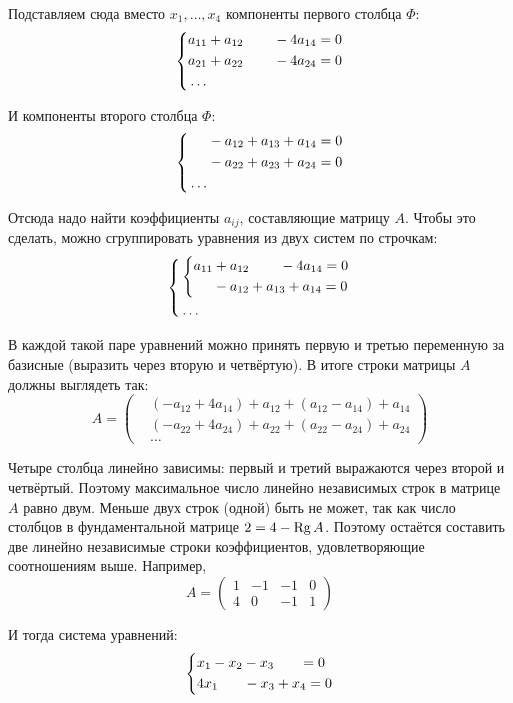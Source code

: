 \documentclass[a4paper,12pt]{article}
\begin{document}
\begin{solution}
    Подставляем сюда вместо $x_1, \ldots, x_4$ компоненты первого столбца $\Phi$:
    \[
      \left\{
        \begin{aligned}
          &a_{11} + a_{12} \hphantom{+ a_{13}} - 4 a_{14} = 0\\
          &a_{21} + a_{22} \hphantom{+ a_{23}} - 4 a_{24} = 0\\
          &\ldots
        \end{aligned}
      \right.
    \]
    
    И компоненты второго столбца $\Phi$:
    \[
      \left\{
        \begin{aligned}
          &\hphantom{a_{11}} - a_{12} + a_{13} + a_{14} = 0\\
          &\hphantom{a_{21}} - a_{22} + a_{23} + a_{24} = 0\\
          &\ldots
        \end{aligned}
      \right.
    \]
    
    Отсюда надо найти коэффициенты $a_{ij}$, составляющие матрицу $A$.
    Чтобы это сделать, можно сгруппировать уравнения из двух систем по строчкам:
    \[
      \left\{
        \begin{aligned}
          &\left\{
            \begin{aligned}
              &a_{11} + a_{12} \hphantom{+ a_{13}} - 4 a_{14} = 0\\
              &\hphantom{a_{11}} - a_{12} + a_{13} + a_{14} = 0\\
            \end{aligned}
          \right.\\
          &\ldots
        \end{aligned}
      \right.
    \]
    
    В каждой такой паре уравнений можно принять первую и третью переменную за базисные (выразить через вторую и четвёртую).
    В итоге строки матрицы $A$ должны выглядеть так:
    \[
      A = \begin{pmatrix}
        &(-a_{12} + 4 a_{14}) + a_{12} + (a_{12} - a_{14}) + a_{14}\\
        &(-a_{22} + 4 a_{24}) + a_{22} + (a_{22} - a_{24}) + a_{24}\\
        &\ldots
      \end{pmatrix}
    \]
    
    Четыре столбца линейно зависимы: первый и третий выражаются через второй и четвёртый.
    Поэтому максимальное число линейно независимых строк в матрице $A$ равно двум.
    Меньше двух строк (одной) быть не может, так как число столбцов в фундаментальной матрице $2 \hm= 4 \hm- \Rg A$.
    Поэтому остаётся составить две линейно независимые строки коэффициентов, удовлетворяющие соотношениям выше.
    Например,
    \[
      A = \begin{pmatrix}
        1 & -1 & -1 & 0\\
        4 & 0 & -1 & 1
      \end{pmatrix}
    \]
    
    И тогда система уравнений:
    \[
      \left\{
        \begin{aligned}
          &x_1 - x_2 - x_3 \hphantom{+ x_4} = 0\\
          &4x_1 \hphantom{+ x_2} - x_3 + x_4 = 0
        \end{aligned}
      \right.
    \]
  \end{solution}
\end{document}
